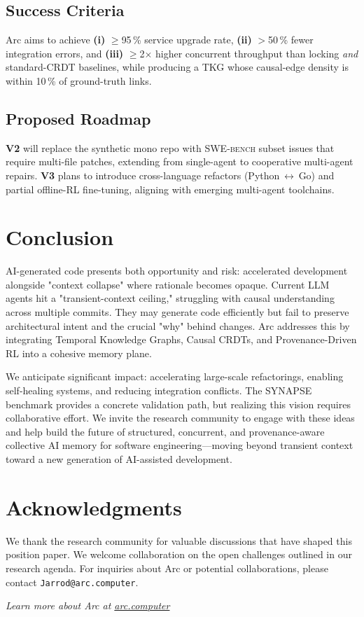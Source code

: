 \documentclass{article}
\begin{document}
\subsection{Success Criteria}
Arc aims to achieve \textbf{(i)} $\ge$95\,\% service upgrade rate, \textbf{(ii)} $>$50\,\% fewer integration errors, and \textbf{(iii)} $\ge$2$\times$ higher concurrent throughput than locking \emph{and} standard-CRDT baselines, while producing a TKG whose causal-edge density is within 10\,\% of ground-truth links.

\subsection{Proposed Roadmap}

\textbf{V2} will replace the synthetic mono repo with  \textsc{SWE-bench} subset issues that require multi-file patches, extending from single-agent to cooperative multi-agent repairs. \textbf{V3} plans to introduce cross-language refactors (Python $\leftrightarrow$ Go) and partial offline-RL fine-tuning, aligning with emerging multi-agent toolchains.

\section{Conclusion}
AI-generated code presents both opportunity and risk: accelerated development alongside "context collapse" where rationale becomes opaque. Current LLM agents hit a "transient-context ceiling," struggling with causal understanding across multiple commits. They may generate code efficiently but fail to preserve architectural intent and the crucial "why" behind changes. Arc addresses this by integrating Temporal Knowledge Graphs, Causal CRDTs, and Provenance-Driven RL into a cohesive memory plane.

We anticipate significant impact: accelerating large-scale refactorings, enabling self-healing systems, and reducing integration conflicts. The SYNAPSE benchmark provides a concrete validation path, but realizing this vision requires collaborative effort. We invite the research community to engage with these ideas and help build the future of structured, concurrent, and provenance-aware collective AI memory for software engineering—moving beyond transient context toward a new generation of AI-assisted development.

\section*{Acknowledgments}
We thank the research community for valuable discussions that have shaped this position paper. We welcome collaboration on the open challenges outlined in our research agenda. For inquiries about Arc or potential collaborations, please contact \texttt{Jarrod@arc.computer}.




\clearpage


\vspace{0.5cm}
\begin{center}
\textit{Learn more about Arc at \href{https://arc.computer}{arc.computer}}
\end{center}
\end{document}

